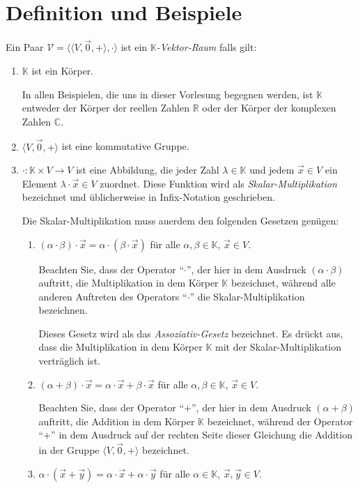 \section{Definition und Beispiele}
\begin{Definition}
Ein Paar $\mathcal{V} = \bigl\langle \langle V, \vec{0}, + \rangle, \cdot \bigr\rangle$ ist ein
{\emph{\color{blue}$\mathbb{K}$-Vektor-Raum}} falls gilt:
\begin{enumerate}
\item $\mathbb{K}$ ist ein K\"{o}rper.  

      In allen Beispielen, die uns in dieser Vorlesung begegnen werden,
      ist $\mathbb{K}$ entweder der K\"{o}rper der reellen Zahlen $\mathbb{R}$ oder der K\"{o}rper der komplexen Zahlen $\mathbb{C}$. 
\item $\langle V, \vec{0}, + \rangle$ ist eine kommutative Gruppe.
\item $\cdot: \mathbb{K} \times V \rightarrow V$ ist eine Abbildung, die jeder Zahl $\lambda \in \mathbb{K}$ und jedem 
      $\vec{x} \in V$ ein Element $\lambda \cdot \vec{x} \in V$ zuordnet. 
      Diese Funktion  wird als {\emph{\color{blue}Skalar-Multiplikation}} bezeichnet und
      \"{u}blicherweise in Infix-Notation geschrieben. 

      Die Skalar-Multiplikation muss au\3erdem den folgenden Gesetzen gen\"{u}gen:
      \begin{enumerate}
      \item $(\alpha \cdot \beta)  \cdot \vec{x} =  \alpha \cdot (\beta \cdot \vec{x})$ \quad f\"ur alle  $\alpha,\beta \in \mathbb{K}$,  $\vec{x} \in V$.

            Beachten Sie, dass der Operator ``$\cdot$'', der hier in dem Ausdruck $(\alpha \cdot \beta)$ auftritt, 
            die Multiplikation in dem K\"{o}rper $\mathbb{K}$ bezeichnet, w\"{a}hrend alle anderen Auftreten des Operators ``$\cdot$'' 
            die Skalar-Multiplikation bezeichnen.  

            Dieses Gesetz wird als das {\emph{\color{blue}Assoziativ-Gesetz}} bezeichnet.  Es dr\"{u}ckt
            aus, dass die Multiplikation in dem K\"{o}rper $\mathbb{K}$ mit der Skalar-Multiplikation
            vertr\"{a}glich ist.
      \item $(\alpha + \beta) \cdot \vec{x} = \alpha \cdot \vec{x} + \beta \cdot \vec{x}$ \quad f\"ur alle  $\alpha,\beta \in \mathbb{K}$,  $\vec{x} \in V$.

            Beachten Sie, dass der Operator ``$+$'', der  hier in dem Ausdruck $(\alpha + \beta)$
            auftritt, die Addition in dem K\"{o}rper $\mathbb{K}$ bezeichnet, w\"{a}hrend der
            Operator ``$+$'' in dem Ausdruck auf der rechten Seite dieser Gleichung die 
            Addition in der Gruppe $\langle V, \vec{0}, + \rangle$ bezeichnet.  
      \item $\alpha \cdot (\vec{x} + \vec{y}) = \alpha \cdot \vec{x} + \alpha \cdot \vec{y}$ \quad f\"ur alle $\alpha \in \mathbb{K}$,  $\vec{x}, \vec{y} \in V$.


\end{enumerate}
\end{enumerate}
\end{Definition}
